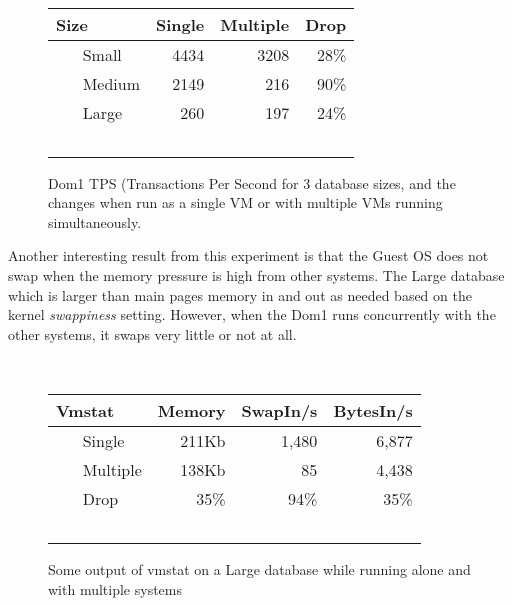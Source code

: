 \begin{figure}
  \begin{tabular}{ l | r | r | r }
    Size & Single & Multiple & Drop \\
    \hline
    Small & 4434 & 3208 & 28\% \\ \hline
    Medium & 2149 & 216 & 90\% \\ \hline
    Large & 260 & 197 & 24\% \\  \hline
  \end{tabular}
\caption{Dom1 TPS (Transactions Per Second for 3 database sizes, and the changes when run as a single VM or with multiple VMs running simultaneously.}
\label{fig:tps1}
\end{figure}

Another interesting result from this experiment is that the Guest OS does not swap when the memory pressure is high from other systems.  The Large database which is larger than main pages memory in and out as needed based on the kernel \emph{swappiness} setting.  However, when the Dom1 runs concurrently with the other systems, it swaps very little or not at all.
\begin{figure}
  \begin{tabular}{ l | r | r | r }
    Vmstat & Memory & SwapIn/s & BytesIn/s \\
    \hline
    Single & 211Kb &  1,480 & 6,877 \\ \hline
    Multiple & 138Kb & 85 & 4,438 \\ \hline
    Drop & 35\% & 94\% & 35\% \\  \hline
  \end{tabular}
\caption{Some output of vmstat on a Large database while running alone and with multiple systems} 
\label{fig:vmstat}
\end{figure}

